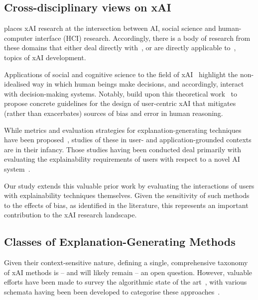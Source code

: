 \documentclass[final,5p,times,twocolumn,hyphens]{elsarticle}
\begin{document}
\subsection{Cross-disciplinary views on xAI}

\citet{miller2019explanation} places xAI research at the intersection between AI, social science and human-computer interface (HCI) research. Accordingly, there is a body of research from these domains that either deal directly with~\cite{abdul2020cogam, holzinger2013human}, or are directly applicable to~\cite{nielsen2005ten}, topics of xAI development.

Applications of social and cognitive science to the field of xAI~\cite{de2017people, miller2019explanation, lipton2018mythos, jussupow2021augmenting} highlight the non-idealised way in which human beings make decisions, and accordingly, interact with decision-making systems. Notably, \citet{wang_designing_2019} build upon this theoretical work~\cite{hoffman2017explainingpart1,hoffman2017explainingpart2, klein2018explainingpart3, hoffman2018explainingpart4} to propose concrete guidelines for the design of user-centric xAI that mitigates (rather than exacerbates) sources of bias and error in human reasoning.

While metrics and evaluation strategies for explanation-generating techniques have been proposed~\cite{doshi2017towards, HolzingerEtAl:2019:Wiley-Paper, HolzingerEtAl:2020:QualityOfExplanations}, studies of these in user- and application-grounded contexts are in their infancy. Those studies having been conducted deal primarily with evaluating the explainability requirements of users with respect to a novel AI system~\cite{liao2020questioning, cai2019hello}.

Our study extends this valuable prior work by evaluating the interactions of users with explainability techniques themselves. Given the sensitivity of such methods to the effects of bias, as identified in the literature, this represents an important contribution to the xAI research landscape.

\subsection{Classes of Explanation-Generating Methods}
\label{sec:related:classes}

Given their context-sensitive nature, defining a single, comprehensive taxonomy of xAI methods is -- and will likely remain -- an open question. However, valuable efforts have been made to survey the algorithmic state of the art~\cite{tjoa_survey_2020, deshpande2021brief}, with various schemata having been been developed to categorise these approaches~\cite{arrieta2020explainable}.
\end{document}
